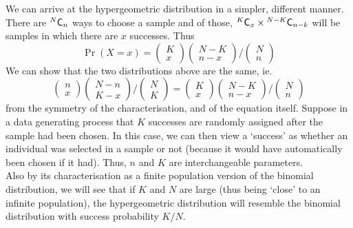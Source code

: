 \documentclass[11pt]{report} %
\begin{document}
We can arrive at the hypergeometric distribution in a simpler, different manner. There are $\mathstrut^{N}\mathsf{C}_{n}$ ways to choose a sample and of those, $\mathstrut^{K}\mathsf{C}_{x}\times\mathstrut^{N - K}\mathsf{C}_{n - k}$ will be samples in which there are $x$ successes. Thus
\begin{equation}
\operatorname{Pr}\left(X = x\right) = \begin{pmatrix}K \\ x\end{pmatrix}\begin{pmatrix}N - K \\ n - x\end{pmatrix}/\begin{pmatrix}N \\ n\end{pmatrix}
\end{equation}
We can show that the two distributions above are the same, ie.
\begin{equation}
\begin{pmatrix}n \\ x\end{pmatrix}\begin{pmatrix}N - n \\ K - x\end{pmatrix}/\begin{pmatrix}N \\ K\end{pmatrix} = \begin{pmatrix}K \\ x\end{pmatrix}\begin{pmatrix}N - K \\ n - x\end{pmatrix}/\begin{pmatrix}N \\ n\end{pmatrix}
\end{equation}
from the symmetry of the characterisation, and of the equation itself. Suppose in a data generating process that $K$ successes are randomly assigned after the sample had been chosen. In this case, we can then view a `success' as whether an individual was selected in a sample or not (because it would have automatically been chosen if it had). Thus, $n$ and $K$ are interchangeable parameters. \\

Also by its characterisation as a finite population version of the binomial distribution, we will see that if $K$ and $N$ are large (thus being `close' to an infinite population), the hypergeometric distribution will resemble the binomial distribution with success probability $K/N$. 
\end{document}
